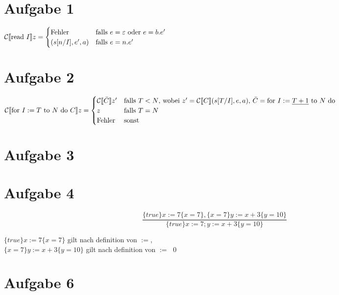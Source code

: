 




\newcommand{\nr}{5}


\section*{Aufgabe 1}
${\mathcal{C}\llbracket\text{read }I\rrbracket} z = 
\begin{cases}
    \text{Fehler} & \text{falls $e=\varepsilon$ oder $e=b.e'$} 
\\
    (s[n/I], e', a) & \text{falls $e=n.e'$}
\end{cases}$

\section*{Aufgabe 2}
${\mathcal{C}\llbracket\text{for } I:=T \text{ to } N \text{ do } C\rrbracket} z = 
\begin{cases}
    {\mathcal{C}\llbracket\bar{C}\rrbracket} z' & \text{falls $T<N$,
                           wobei $z' = {\mathcal{C}\llbracket C\rrbracket}(s[T/I],e,a)$,
                           $\bar{C}=\text{for } I:=\underline{T+1} \text{ to } N \text{ do }$
                        } 
\\
    z & \text{falls $T=N$} 
\\
    \text{Fehler} & \text{sonst}
\end{cases}$

\section*{Aufgabe 3}

\section*{Aufgabe 4}

$$\frac
    { \{true\} x:=7 \{x=7\}, \{x=7\} y:=x+3 \{y=10\} }
    { \{true\} x:=7; y:=x+3 \{y=10\} }
$$

$\{true\} x:=7 \{x=7\}$ gilt nach definition von $:=$,\\
$\{x=7\} y:=x+3 \{y=10\}$ gilt nach definition von $:=$
\qed

\section*{Aufgabe 6}



